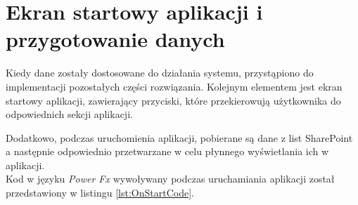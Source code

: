 \section{Ekran startowy aplikacji i przygotowanie danych}
\label{relacje-list}

Kiedy dane zostały dostosowane do działania systemu, przystąpiono do implementacji pozostałych części rozwiązania.
Kolejnym elementem jest ekran startowy aplikacji, zawierający przyciski, które przekierowują użytkownika do odpowiednich sekcji aplikacji.



Dodatkowo, podczas uruchomienia aplikacji, pobierane są dane z list SharePoint a następnie odpowiednio przetwarzane w celu płynnego wyświetlania ich w aplikacji. \\
Kod w języku \emph{Power Fx} wywoływany podczas uruchamiania aplikacji został przedstawiony w listingu \ref{lst:OnStartCode}.


